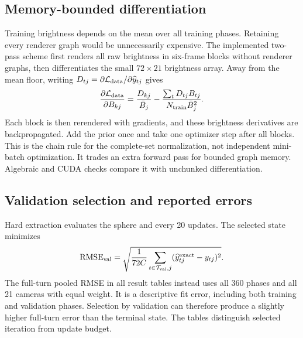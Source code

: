 \documentclass[10pt,a4paper]{article}
\newcommand{\RMSE}{\operatorname{RMSE}}
\begin{document}
\subsection{Memory-bounded differentiation}
Training brightness depends on the mean over all training phases.
Retaining every renderer graph would be unnecessarily expensive.
The implemented two-pass scheme first renders all raw brightness in
six-frame blocks without renderer graphs, then differentiates the small
$72\times21$ brightness array. Away from the mean floor, writing
$D_{tj}=\partial\mathcal L_{\rm data}/\partial\widehat y_{tj}$ gives
\begin{equation}
 \frac{\partial\mathcal L_{\rm data}}{\partial B_{kj}}
 =\frac{D_{kj}}{\bar B_j}
 -\frac{\sum_t D_{tj}B_{tj}}{N_{\rm train}\bar B_j^2}.
 \label{eq:two-pass}
\end{equation}
Each block is then rerendered with gradients, and these brightness
derivatives are backpropagated. Add the prior once and take one optimizer
step after all blocks. This is the chain rule for the complete-set
normalization, not independent mini-batch optimization. It trades an
extra forward pass for bounded graph memory. Algebraic and CUDA checks
compare it with unchunked differentiation.

\subsection{Validation selection and reported errors}
Hard extraction evaluates the sphere and every 20 updates. The selected
state minimizes
\begin{equation}
 \RMSE_{\rm val}=\sqrt{\frac{1}{72C}
 \sum_{t\in\mathcal T_{\rm val},j}
 (\widehat y^{\rm exact}_{tj}-y_{tj})^2}.
\end{equation}
The full-turn pooled RMSE in all result tables instead uses all 360 phases
and all 21 cameras with equal weight. It is a descriptive fit error,
including both training and validation phases. Selection by validation
can therefore produce a slightly higher full-turn error than the terminal
state. The tables distinguish selected iteration from update budget.

\clearpage
\end{document}

